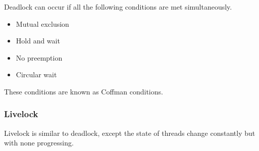 Deadlock can occur if all the following conditions are met simultaneously.

\begin{itemize}
\item	Mutual exclusion
\item	Hold and wait
\item	No preemption
\item	Circular wait
\end{itemize}

These conditions are known as Coffman conditions.


\subsubsection{Livelock}

Livelock is similar to deadlock, except the state of threads change constantly but with none progressing. 



